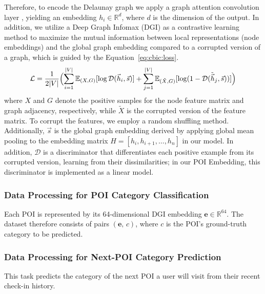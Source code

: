 Therefore, to encode the Delaunay graph we apply a graph attention convolution layer \cite{velivckovic2017graph}, yielding an embedding $h_i \in \mathbb{R}^{d}$, where $d$ is the dimension of the output. In addition, we utilize a Deep Graph Infomax (DGI) \cite{velickovic2019deep} as a contrastive learning method to maximize the mutual information between local representations (node embeddings) and the global graph embedding compared to a corrupted version of a graph, which is guided by the Equation~\ref{eq:cbic:loss}.
%
\begin{equation}
  \mathcal{L}
  = \frac{1}{2|V|}\Bigl(
        \sum_{i=1}^{|V|}
          \mathbb{E}_{(X,G)}
          [\log \mathcal{D}(\vec{h}_i,\vec{s})]
        +
        \sum_{j=1}^{|V|}
          \mathbb{E}_{(\tilde{X}, G)}
          [\log (1-\mathcal{D}(\tilde{\vec{h}}_j,\vec{s}))]\Bigr)
  \label{eq:cbic:loss}
\end{equation}
%
where $X$ and $G$ denote the positive samples for the node feature matrix and graph adjacency, respectively, while $\tilde{X}$ is the corrupted version of the feature matrix. To corrupt the features, we employ a random shuffling method. Additionally, $\vec{s}$ is the global graph embedding derived by applying global mean pooling to the embedding matrix $H = [h_i, h_{i+1}, \ldots, h_{n}]$ in our model. In addition, $\mathcal{D}$ is a discriminator that differentiates each positive example from its corrupted version, learning from their dissimilarities; in our POI Embedding, this discriminator is implemented as a linear model.

\subsubsection{Data Processing for POI Category Classification}
Each POI is represented by its 64-dimensional DGI embedding $\mathbf{e}\!\in\!\mathbb{R}^{64}$.
The dataset therefore consists of pairs $(\mathbf{e},\,c)$, where $c$ is the POI's ground-truth category to be predicted.

\subsubsection{Data Processing for Next-POI Category Prediction}
This task predicts the category of the next POI a user will visit from their recent check-in history.


